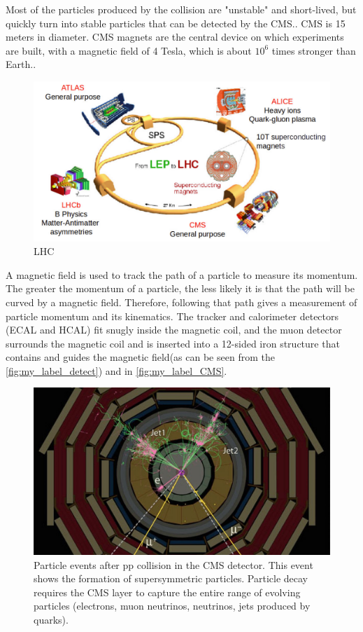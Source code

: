 Most of the particles produced by the collision are "unstable" and short-lived, but quickly turn into stable particles that can be detected by the CMS.\cite{CMS_1}\cite{CMS:2008xjf}.
 CMS is 15 meters in diameter. CMS magnets are the central device on which experiments are built, with a magnetic field of 4 Tesla, which is about $10^6$ times stronger than Earth.\cite{CMS:2008xjf}\cite{CMS_2}.
 \begin{figure}[H]
     \centering
     \includegraphics[scale=0.3]{Detector/14__ml.png}
     \caption{LHC}
     \label{fig:my_label_LHC}
 \end{figure}
A magnetic field is used to track the path of a particle to measure its momentum\cite{CMS_1}. The greater the momentum of a particle, the less likely it is that the  path will be curved by a magnetic field. Therefore, following that path gives a measurement of particle momentum and its kinematics. The tracker and calorimeter detectors (ECAL and HCAL) fit snugly inside the magnetic coil, and the muon detector surrounds the magnetic coil and is inserted into a 12-sided iron structure that contains and guides the magnetic field(as can be seen from the \autoref{fig:my_label_detect})\cite{CMS_2} and in \autoref{fig:my_label_CMS}.
\begin{figure}[H]
    \centering
    \includegraphics[scale=0.3]{Detector/SusyAny.jpg}
    \caption{Particle events after pp collision in the CMS detector. This event shows the formation of supersymmetric particles. Particle decay requires the CMS layer to capture the entire range of evolving particles (electrons, muon neutrinos, neutrinos, jets produced by quarks).\cite{CMS_3}}
    \label{fig:my_label_detect}
\end{figure}


